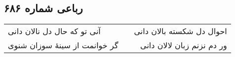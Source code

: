 \begin{center}
\section*{رباعی شماره ۶۸۶}
\label{sec:sh686}
\begin{longtable}{l p{0.5cm} r}
آنی تو که حال دل نالان دانی
&&
احوال دل شکسته بالان دانی
\\
گر خوانمت از سینهٔ سوزان شنوی
&&
ور دم نزنم زبان لالان دانی
\\
\end{longtable}
\end{center}
